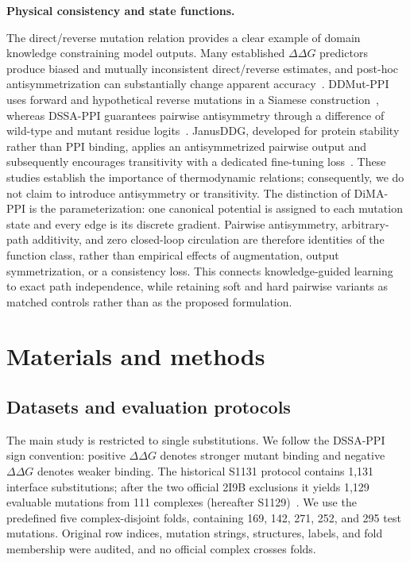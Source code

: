 \documentclass[preprint,12pt]{elsarticle}
\newcommand{\ddg}{\Delta\Delta G}
\begin{document}
\medskip
\noindent\textbf{Physical consistency and state functions.}

The direct/reverse mutation relation provides a clear example of domain knowledge constraining model outputs. Many established $\ddg$ predictors produce biased and mutually inconsistent direct/reverse estimates, and post-hoc antisymmetrization can substantially change apparent accuracy~\cite{ddgbias}. DDMut-PPI uses forward and hypothetical reverse mutations in a Siamese construction~\cite{ddmutppi}, whereas DSSA-PPI guarantees pairwise antisymmetry through a difference of wild-type and mutant residue logits~\cite{dssappi}. JanusDDG, developed for protein stability rather than PPI binding, applies an antisymmetrized pairwise output and subsequently encourages transitivity with a dedicated fine-tuning loss~\cite{janusddg}. These studies establish the importance of thermodynamic relations; consequently, we do not claim to introduce antisymmetry or transitivity. The distinction of DiMA-PPI is the parameterization: one canonical potential is assigned to each mutation state and every edge is its discrete gradient. Pairwise antisymmetry, arbitrary-path additivity, and zero closed-loop circulation are therefore identities of the function class, rather than empirical effects of augmentation, output symmetrization, or a consistency loss. This connects knowledge-guided learning~\cite{pinnreview} to exact path independence, while retaining soft and hard pairwise variants as matched controls rather than as the proposed formulation.

\section{Materials and methods}
\label{sec:methods}

\subsection{Datasets and evaluation protocols}

The main study is restricted to single substitutions. We follow the DSSA-PPI sign convention: positive $\ddg$ denotes stronger mutant binding and negative $\ddg$ denotes weaker binding. The historical S1131 protocol contains 1,131 interface substitutions; after the two official 2I9B exclusions it yields 1,129 evaluable mutations from 111 complexes (hereafter S1129)~\cite{skempi1,skempi2,dssappi}. We use the predefined five complex-disjoint folds, containing 169, 142, 271, 252, and 295 test mutations. Original row indices, mutation strings, structures, labels, and fold membership were audited, and no official complex crosses folds.
\end{document}
